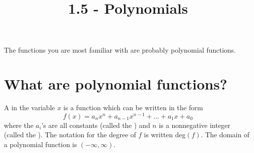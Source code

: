 \documentclass{ximera}
\title{1.5 - Polynomials}
\begin{document}
\begin{abstract} \end{abstract}
\maketitle

The functions you are most familiar with are probably polynomial
functions.

\section{What are polynomial functions?}

\begin{definition}
  A  in the variable $x$ is a function
  which can be written in the form
  \[
  f(x) = a_nx^n + a_{n-1}x^{n-1} + \dots + a_1 x + a_0
  \]
  where the $a_i$'s are all constants (called the )
  and $n$ is a nonnegative integer (called the ). The notation for the degree of $f$ is written deg$(f)$. The domain of a polynomial function is $(-\infty,\infty)$.
\end{definition}
\end{document}
